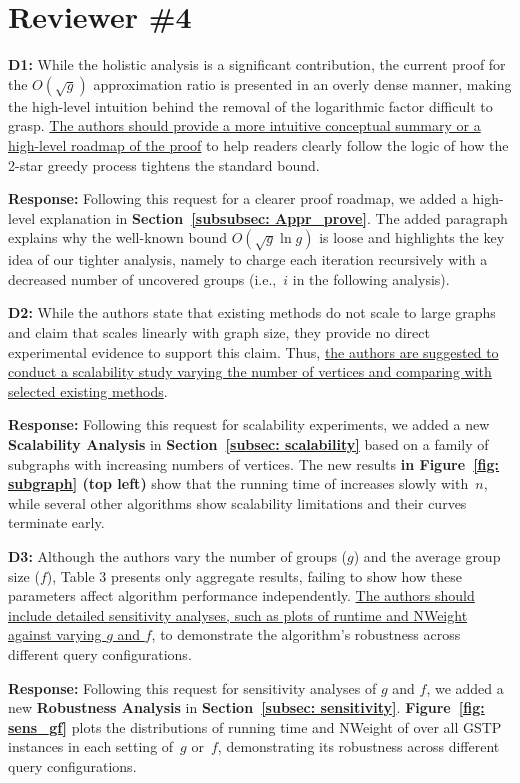 \section*{Reviewer \#4}

\textbf{D1:} While the holistic analysis is a significant contribution, the current proof for the $O(\sqrt{g})$ approximation ratio is presented in an overly dense manner, making the high-level intuition behind the removal of the logarithmic factor difficult to grasp. \uline{The authors should provide a more intuitive conceptual summary or a high-level roadmap of the proof} to help readers clearly follow the logic of how the 2-star greedy process tightens the standard bound.

\textbf{Response:} Following this request for a clearer proof roadmap, we added a high-level explanation in \textbf{Section~\ref{subsubsec: Appr_prove}}. The added paragraph explains why the well-known bound $O(\sqrt{g}\ln g)$ is loose and highlights the key idea of our tighter analysis, namely to charge each iteration recursively with a decreased number of uncovered groups (i.e.,~$i$ in the following analysis).

\textbf{D2:} While the authors state that existing methods do not scale to large graphs and claim that \Improved scales linearly with graph size, they provide no direct experimental evidence to support this claim. Thus, \uline{the authors are suggested to conduct a scalability study varying the number of vertices and comparing \Improved with selected existing methods}.

\textbf{Response:} Following this request for scalability experiments, we added a new \textbf{Scalability Analysis} in \textbf{Section~\ref{subsec: scalability}} based on a family of subgraphs with increasing numbers of vertices. The new results \textbf{in Figure~\ref{fig: subgraph} (top left)} show that the running time of \Improved increases slowly with~$n$, while several other algorithms show scalability limitations and their curves terminate early.

\textbf{D3:} Although the authors vary the number of groups ($g$) and the average group size ($f$), Table 3 presents only aggregate results, failing to show how these parameters affect algorithm performance independently. \uline{The authors should include detailed sensitivity analyses, such as plots of runtime and NWeight against varying $g$ and $f$}, to demonstrate the algorithm's robustness across different query configurations.

\textbf{Response:} Following this request for sensitivity analyses of $g$ and $f$, we added a new \textbf{Robustness Analysis} in \textbf{Section~\ref{subsec: sensitivity}}. \textbf{Figure~\ref{fig: sens_gf}} plots the distributions of running time and NWeight of \ImprovPTS over all GSTP instances in each setting of~$g$ or~$f$, demonstrating its robustness across different query configurations.

